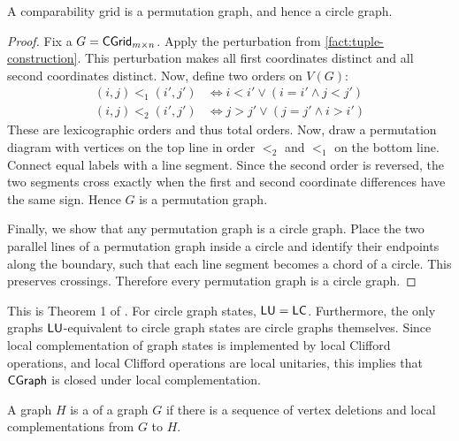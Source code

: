 

\begin{theorem}
\label{thm:cgrid-is-perm-is-circle}
A comparability grid is a permutation graph, and hence a circle graph.
\end{theorem}

\begin{proof}
Fix a $G = \mathsf{CGrid}_{m \times n}$. Apply the perturbation from \ref{fact:tuple-construction}. This perturbation makes all first coordinates distinct and all second coordinates distinct. Now, define two orders on $V(G)$:
\begin{align}
    (i,j) <_1 (i',j') &\iff i < i' \lor (i = i' \land j < j') \\
    (i,j) <_2 (i',j') &\iff j > j' \lor (j = j' \land i > i')
\end{align}
These are lexicographic orders and thus total orders. Now, draw a permutation diagram with vertices on the top line in order $<_2$ and $<_1$ on the bottom line. Connect equal labels with a line segment. Since the second order is reversed, the two segments cross exactly when the first and second coordinate differences have the same sign. Hence $G$ is a permutation graph.

Finally, we show that any permutation graph is a circle graph. Place the two parallel lines of a permutation graph inside a circle and identify their endpoints along the boundary, such that each line segment becomes a chord of a circle. This preserves crossings. Therefore every permutation graph is a circle graph.
\end{proof}

\begin{theorem}
\label{thm:circle-graph-lu-equals-lc}
This is Theorem 1 of \cite{circle-graphs}. For circle graph states, $\mathsf{LU} = \mathsf{LC}$. Furthermore, the only graphs $\mathsf{LU}$-equivalent to circle graph states are circle graphs themselves. Since local complementation of graph states is implemented by local Clifford
operations, and local Clifford operations are local unitaries, this implies that $\mathsf{CGraph}$ is closed under local complementation.
\end{theorem}

\begin{definition}
\label{def:vertex-minor}
A graph $H$ is a  of a graph $G$ if there is a sequence of vertex deletions and local complementations from $G$ to $H$.
\end{definition}

